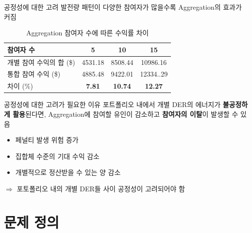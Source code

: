 \documentclass[xcolor=dvipsnames,t,9pt]{beamer}
\begin{document}
\begin{frame}{공정성에 대한 고려}
    발전량 패턴이 다양한 참여자가 많을수록 Aggregation의 효과가 커짐
    \vspace{-1em}
    \begin{table}[]
        \caption{Aggregation 참여자 수에 따른 수익률 차이}
        \footnotesize
        \begin{tabular}{lccc}
            \hline
            참여자 수            & 5             & 10             & 15             \\ \hline
            개별 참여 수익의 합 (\$) & 4531.18       & 8508.44        & 10986.16       \\
            통합 참여 수익 (\$)    & 4885.48       & 9422.01        & 12334..29      \\ \hline
            차이 (\%)          & \textbf{7.81} & \textbf{10.74} & \textbf{12.27} \\ \hline
        \end{tabular}
    \end{table}

    \begin{alertblock}{공정성에 대한 고려가 필요한 이유}
        포트폴리오 내에서 개별 DER의 에너지가 \textbf{불공정하게 활용}된다면, Aggregation에 참여할 유인이 감소하고 \textbf{참여자의 이탈}이 발생할 수 있음
        \begin{itemize}
            \item 페널티 발생 위험 증가
            \item 집합체 수준의 기대 수익 감소
            \item 개별적으로 정산받을 수 있는 양 감소
        \end{itemize}
        $\Rightarrow$ 포토폴리오 내의 개별 DER들 사이 공정성이 고려되어야 함
    \end{alertblock}

\end{frame}

\section[문제 정의]{문제 정의}
\end{document}
